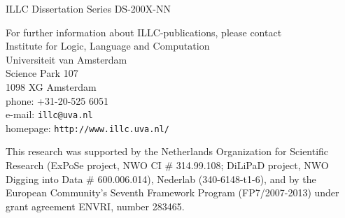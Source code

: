 {\pagestyle{empty}
\newcommand{\printtitle}{%
{\Huge \titleof{main-with-break}}}    

%
%

\par\vskip 2cm
\begin{center}
\printtitle
\end{center}

\clearpage
\par\vskip 2cm
\begin{center}
ILLC Dissertation Series DS-200X-NN                 %
\par\vspace {2cm}
\illclogo{10cm}
\par\vspace {2cm}
\noindent%
For further information about ILLC-publications, please contact\\[2ex]
Institute for Logic, Language and Computation\\
Universiteit van Amsterdam\\
Science Park 107\\
1098 XG Amsterdam\\
phone: +31-20-525 6051\\
e-mail: {\tt illc@uva.nl}\\
homepage: {\tt http://www.illc.uva.nl/}
\end{center}
\vfill

%

%
\noindent%
This research was supported by the Netherlands Organization for Scientific Research
(ExPoSe project, NWO CI \# 314.99.108; DiLiPaD project, NWO Digging into Data
\# 600.006.014), Nederlab (340-6148-t1-6), and by the European Community’s Seventh
Framework Program (FP7/2007-2013) under grant agreement ENVRI, number 283465.
\par\vspace {2cm}

}
